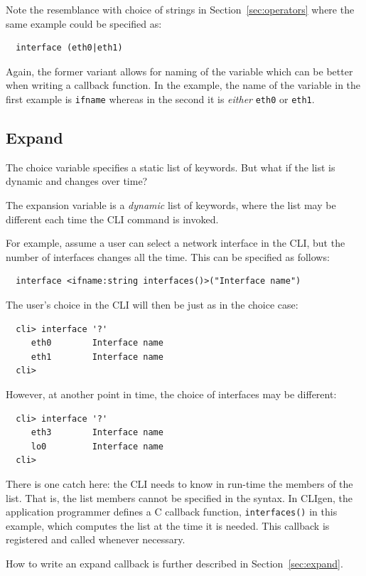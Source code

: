 \documentclass[a4paper, 10pt] {article}
\begin{document}
Note the resemblance with choice of strings in
Section~\ref{sec:operators} where the same example could be specified
as:
\begin{verbatim}
  interface (eth0|eth1)
\end{verbatim}

Again, the former variant allows for naming of the variable which can
be better when writing a callback function. In the example, the name
of the variable in the first example is {\tt ifname} whereas in the
second it is \emph{either} {\tt eth0} or {\tt eth1}.

\subsection{Expand}
\label{sec:expand1}
The choice variable specifies a static list of
keywords. But what if the list is dynamic and changes over time?

The expansion variable is a \emph{dynamic} list of keywords, where the
list may be different each time the CLI command is invoked.

For example, assume a user can select a network interface in the CLI,
but the number of interfaces changes all the time. This can be
specified as follows:

\begin{verbatim}
  interface <ifname:string interfaces()>("Interface name")
\end{verbatim}
The user's choice in the CLI will then be just as in the choice case:
\begin{verbatim}
  cli> interface '?'
     eth0        Interface name
     eth1        Interface name
  cli> 
\end{verbatim}

However, at another point in time, the choice of interfaces may be different:
\begin{verbatim}
  cli> interface '?'
     eth3        Interface name
     lo0         Interface name
  cli> 
\end{verbatim}

There is one catch here: the CLI needs to know in run-time the members
of the list. That is, the list members cannot be specified in the
syntax.  In CLIgen, the application programmer defines a C callback
function, {\tt interfaces()} in this example, which computes the list
at the time it is needed. This callback is registered and called
whenever necessary.

How to write an expand callback is further described in
Section~\ref{sec:expand}.
\end{document}
